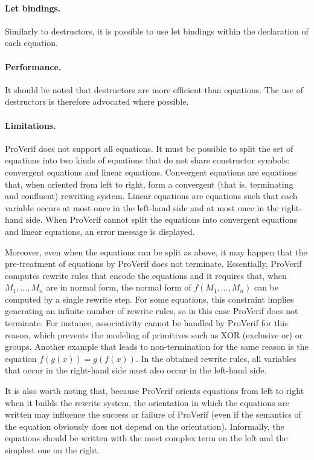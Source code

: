 \documentclass{book}
\begin{document}
\paragraph{Let bindings.} Similarly to destructors, it is possible to use let bindings within the declaration of each equation. 

\paragraph{Performance.} It should be noted that destructors are more efficient than equations.
The use of destructors is therefore advocated where possible.

\paragraph{Limitations.}

ProVerif does not support all equations. It must be possible to split
the set of equations into two kinds of equations that do not share
constructor symbols: convergent equations and linear equations.
Convergent equations are equations that, when oriented from left to
right, form a convergent (that is, terminating and confluent) rewriting system.
Linear equations are equations such that each variable occurs at most once
in the left-hand side and at most once in the right-hand side.
When ProVerif cannot split the equations into convergent equations
and linear equations, an error message is displayed.

Moreover, even when the equations can be split as above, it may happen that
the pre-treatment of equations by ProVerif does not terminate.
Essentially, ProVerif computes rewrite rules that encode the equations and
it requires that, when $M_1, \ldots, M_n$ are in normal form,
the normal form of $f(M_1, \ldots, M_n)$ can be computed by a single rewrite step.
For some equations, this constraint implies generating an infinite number of rewrite
rules, so in this case ProVerif does not terminate.
For instance, associativity cannot be handled by ProVerif for this reason,
which prevents the modeling of primitives such as XOR (exclusive or) or
groups. Another example that leads to non-termination for the same reason
is the equation $f(g(x)) = g(f(x))$.
In the obtained rewrite rules, all variables that occur in the right-hand
side must also occur in the left-hand side.

It is also worth noting that, because ProVerif orients equations from
left to right when it builds the rewrite system, the orientation in which the
equations are written may influence the success or failure of ProVerif
(even if the semantics of the equation obviously does not depend on
the orientation).
Informally, the equations should be written with the most complex
term on the left and the simplest one on the right.
\end{document}
